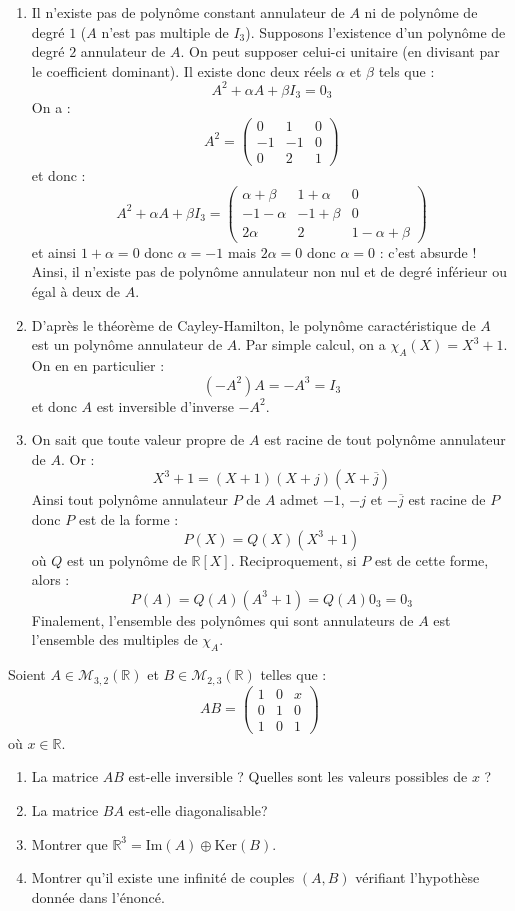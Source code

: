 \documentclass[a4paper,10pt]{report}
\begin{document}
\corr \begin{enumerate}
\item Il n'existe pas de polynôme constant annulateur de $A$ ni de polynôme de degré $1$ ($A$ n'est pas multiple de $I_3$). Supposons l'existence d'un polynôme de degré $2$ annulateur de $A$. On peut supposer celui-ci unitaire (en divisant par le coefficient dominant). Il existe donc deux réels $\alpha$ et $\beta$ tels que :
$$ A^2 + \alpha A + \beta I_3 = 0_3$$
On a :
$$ A^2 = \begin{pmatrix}
0 & 1 & 0 \\
-1 & -1 & 0 \\
0 & 2 & 1 
\end{pmatrix}$$
et donc :
$$ A^2+ \alpha A + \beta I_3 = \begin{pmatrix}
\alpha+ \beta & 1+ \alpha & 0 \\
-1- \alpha & -1+ \beta & 0 \\
2 \alpha & 2 & 1  - \alpha + \beta
\end{pmatrix}$$
et ainsi $1+ \alpha = 0$ donc $\alpha =-1$ mais $2 \alpha = 0$ donc $\alpha = 0$ : c'est absurde ! Ainsi, il n'existe pas de polynôme annulateur non nul et de degré inférieur ou égal à deux de $A$.
\item D'après le théorème de Cayley-Hamilton, le polynôme caractéristique de $A$ est un polynôme annulateur de $A$. Par simple calcul, on a $\chi_A(X) = X^3+1$. On en en particulier :
$$ (-A^2)A= -A^3 = I_3$$
et donc $A$ est inversible d'inverse $-A^2$.
\item On sait que toute valeur propre de $A$ est racine de tout polynôme annulateur de $A$. Or :
$$ X^3+1 = (X+1) (X+j)(X+ \overline{j})$$
Ainsi tout polynôme annulateur $P$ de $A$ admet $-1$, $-j$ et $- \overline{j}$ est racine de $P$ donc $P$ est de la forme :
$$ P(X)= Q(X) (X^3+1)$$
où $Q$ est un polynôme de $\mathbb{R}[X]$. Reciproquement, si $P$ est de cette forme, alors :
$$ P(A) = Q(A)(A^3+1) = Q(A) 0_3 = 0_3$$
Finalement, l'ensemble des polynômes qui sont annulateurs de $A$ est l'ensemble des multiples de $\chi_A$.
\end{enumerate}

\begin{Exercice}{} Soient $A \in \mathcal{M}_{3,2}(\mathbb{R})$ et $B \in \mathcal{M}_{2,3}(\mathbb{R})$ telles que :
$$ AB = \begin{pmatrix}
1 & 0 & x \\
0 & 1 & 0 \\
1 & 0 & 1 
\end{pmatrix}$$
où $x \in \mathbb{R}$.
\begin{enumerate}
\item La matrice $AB$ est-elle inversible ? Quelles sont les valeurs possibles de $x$ ?
\item La matrice $BA$ est-elle diagonalisable?
\item Montrer que $\mathbb{R}^3 = \textrm{Im}(A) \oplus \textrm{Ker}(B)$.
\item Montrer qu'il existe une infinité de couples $(A,B)$ vérifiant l'hypothèse donnée dans l'énoncé.
\end{enumerate}
\end{Exercice}
\end{document}
